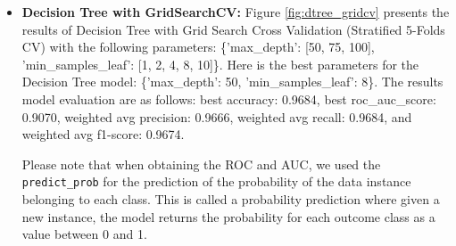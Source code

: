\documentclass[11pt]{article}
\begin{document}
\begin{itemize}
\item \textbf{Decision Tree with GridSearchCV:}
Figure \ref{fig:dtree_gridcv} presents 
the results of Decision Tree with Grid Search Cross Validation (Stratified 5-Folds CV) with the following 
parameters: \{'max\_depth': [50, 75, 100], 'min\_samples\_leaf': [1, 2, 4, 8, 10]\}.
%
Here is the best parameters for the Decision Tree model: \{'max\_depth': 50, 'min\_samples\_leaf': 8\}.
The results model evaluation are as follows:
best accuracy: 0.9684,
best roc\_auc\_score: 0.9070,
weighted avg precision: 0.9666,
weighted avg recall: 0.9684, and
weighted avg f1-score: 0.9674.

Please note that when obtaining the ROC and AUC,
we used the \texttt{predict\_prob} for the prediction of 
the probability of the data instance belonging to each class.
This is called a probability prediction where given a new instance, the model returns the probability for each outcome class as a value between 0 and 1.


\end{itemize}
\end{document}

